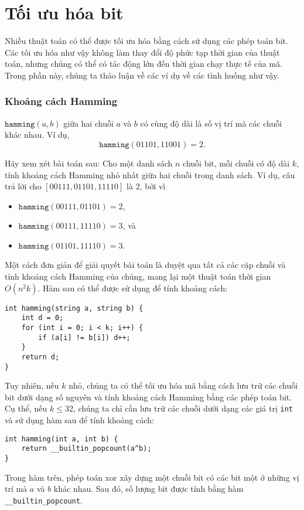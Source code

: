 \section{Tối ưu hóa bit}

Nhiều thuật toán có thể được tối ưu hóa bằng cách sử dụng
các phép toán bit.
Các tối ưu hóa như vậy không làm thay đổi
độ phức tạp thời gian của thuật toán,
nhưng chúng có thể có tác động lớn
đến thời gian chạy thực tế của mã.
Trong phần này, chúng ta thảo luận về các ví dụ
về các tình huống như vậy.

\subsubsection{Khoảng cách Hamming}

$\texttt{hamming}(a,b)$ giữa hai
chuỗi $a$ và $b$ có cùng độ dài là
số vị trí mà các chuỗi khác nhau.
Ví dụ,
\[\texttt{hamming}(01101,11001)=2.\]

Hãy xem xét bài toán sau: Cho
một danh sách $n$ chuỗi bit, mỗi chuỗi có độ dài $k$,
tính khoảng cách Hamming nhỏ nhất
giữa hai chuỗi trong danh sách.
Ví dụ, câu trả lời cho $[00111,01101,11110]$
là 2, bởi vì
\begin{itemize}[noitemsep]
\item $\texttt{hamming}(00111,01101)=2$,
\item $\texttt{hamming}(00111,11110)=3$, và
\item $\texttt{hamming}(01101,11110)=3$.
\end{itemize}

Một cách đơn giản để giải quyết bài toán là
duyệt qua tất cả các cặp chuỗi và tính
khoảng cách Hamming của chúng,
mang lại một thuật toán thời gian $O(n^2 k)$.
Hàm sau có thể được sử dụng để
tính khoảng cách:
\begin{lstlisting}
int hamming(string a, string b) {
    int d = 0;
    for (int i = 0; i < k; i++) {
        if (a[i] != b[i]) d++;
    }
    return d;
}
\end{lstlisting}

Tuy nhiên, nếu $k$ nhỏ, chúng ta có thể tối ưu hóa mã
bằng cách lưu trữ các chuỗi bit dưới dạng số nguyên và
tính khoảng cách Hamming bằng các phép toán bit.
Cụ thể, nếu $k \le 32$, chúng ta chỉ cần lưu trữ
các chuỗi dưới dạng các giá trị \texttt{int} và sử dụng
hàm sau để tính khoảng cách:
\begin{lstlisting}
int hamming(int a, int b) {
    return __builtin_popcount(a^b);
}
\end{lstlisting}
Trong hàm trên, phép toán xor xây dựng
một chuỗi bit có các bit một ở những vị trí
mà $a$ và $b$ khác nhau.
Sau đó, số lượng bit được tính bằng
hàm \texttt{\_\_builtin\_popcount}.

